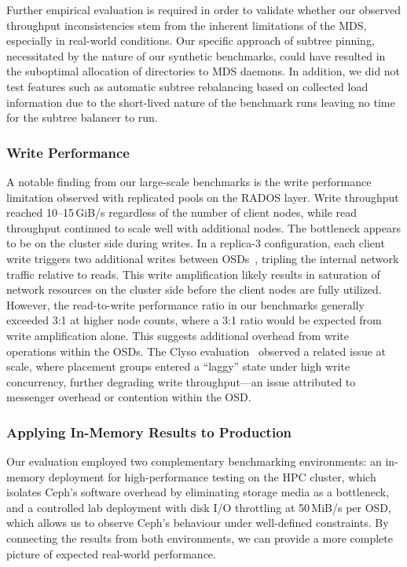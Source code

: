 Further empirical evaluation is required in order to validate whether our observed throughput inconsistencies stem from the inherent limitations of the \ac{MDS}, especially in real-world conditions. Our specific approach of subtree pinning, necessitated by the nature of our synthetic benchmarks, could have resulted in the suboptimal allocation of directories to \ac{MDS} daemons. In addition, we did not test features such as automatic subtree rebalancing based on collected load information due to the short-lived nature of the benchmark runs leaving no time for the subtree balancer to run.

\subsubsection{Write Performance}

A notable finding from our large-scale benchmarks is the write performance limitation observed with replicated pools on the \ac{RADOS} layer. Write throughput reached 10--15\,GiB/s regardless of the number of client nodes, while read throughput continued to scale well with additional nodes. The bottleneck appears to be on the cluster side during writes. In a replica-3 configuration, each client write triggers two additional writes between \acp{OSD}~\cite{ceph-paper}, tripling the internal network traffic relative to reads. This write amplification likely results in saturation of network resources on the cluster side before the client nodes are fully utilized. However, the read-to-write performance ratio in our benchmarks generally exceeded 3:1 at higher node counts, where a 3:1 ratio would be expected from write amplification alone. This suggests additional overhead from write operations within the \acp{OSD}. The Clyso evaluation~\cite{ceph-1tib} observed a related issue at scale, where placement groups entered a ``laggy'' state under high write concurrency, further degrading write throughput---an issue attributed to messenger overhead or contention within the \ac{OSD}.

\subsubsection{Applying In-Memory Results to Production}

Our evaluation employed two complementary benchmarking environments: an in-memory deployment for high-performance testing on the \ac{HPC} cluster, which isolates Ceph's software overhead by eliminating storage media as a bottleneck, and a controlled lab deployment with disk \ac{I/O} throttling at 50\,MiB/s per \ac{OSD}, which allows us to observe Ceph's behaviour under well-defined constraints. By connecting the results from both environments, we can provide a more complete picture of expected real-world performance.

